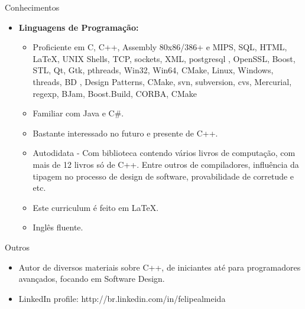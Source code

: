 \documentclass[10pt,oneside]{article}
\newenvironment{ressection}[1]{
	\vspace{4pt}
	{\fontfamily{phv}\selectfont\Large#1}
	\begin{itemize}
	\vspace{3pt}
}{
	\end{itemize}
}
\newcommand{\resitem}[1]{
	\vspace{-4pt}
	\item \begin{flushleft} #1 \end{flushleft}
}
\newcommand{\ressubitem}[1]{
	\vspace{-1pt}
	\item \begin{flushleft} #1 \end{flushleft}
}
\newenvironment{reslist}[1]{
	\resitem{\textbf{#1}}
	\vspace{-5pt}
	\begin{itemize}
}{
	\end{itemize}
}
\begin{document}
\begin{ressection}{Conhecimentos}

	\begin{reslist}{Linguagens de Programa\c{c}\~ao:}

		\ressubitem{Proficiente em C, C++, Assembly 80x86/386+ e MIPS, SQL, HTML, \LaTeX, UNIX Shells, TCP, sockets, XML, postgresql
          , OpenSSL, Boost, STL, Qt, Gtk, pthreads, Win32, Win64, CMake, Linux, Windows, threads, BD
          , Design Patterns, CMake, svn, subversion, cvs, Mercurial, regexp, BJam, Boost.Build, CORBA, CMake}
		\ressubitem{Familiar com Java e C\#.}
		\ressubitem{Bastante interessado no futuro e presente de C++.}
        \ressubitem{Autodidata - Com biblioteca contendo vários livros de computação, com mais de 12 livros só de C++. Entre outros de compiladores, influ\^encia da tipagem
		  no processo de design de software, provabilidade de corretude e etc.}
		\ressubitem{Este curriculum \'e feito em \LaTeX.}
		\ressubitem{Inglês fluente.}

	\end{reslist}

\end{ressection}


\begin{ressection}{Outros}
	\resitem{Autor de diversos materiais sobre C++, de iniciantes
      at\'e para programadores avan\c{c}ados, focando em Software
      Design.}
    \resitem{LinkedIn profile: http://br.linkedin.com/in/felipealmeida}
\end{ressection}
\end{document}
